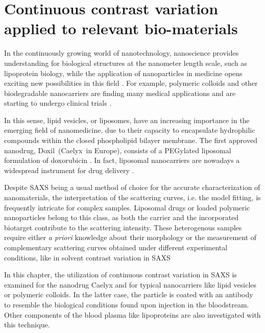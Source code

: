\chapter{Continuous contrast variation applied to relevant bio-materials}
\label{chap:bio_applications}

In the continuously growing world of nanotechnology, nanoscience provides understanding for biological structures at the nanometer length scale, such as lipoprotein biology, while the application of nanoparticles in medicine opens exciting new possibilities in this field \citep{nie_nanotechnology_2007, sahoo_nanotech_2003, wickline_nanotechnology_2003, zhou_nano-enabled_2014, rosen_rise_2005}. For example, polymeric colloids and other biodegradable nanocarriers are finding many medical applications \citep{vicent_polymer_2006} and are starting to undergo clinical trials \citep{patel_polymeric_2012,beija_colloidal_2012,cabral_progress_2014}. 

In this sense, lipid vesicles, or liposomes, have an increasing importance in the emerging field of nanomedicine, due to their capacity to encapsulate hydrophilic compounds within the closed phospholipid bilayer membrane. The first approved nanodrug, Doxil\textregistered\ (Caelyx\textregistered\ in Europe), consists of a PEGylated liposomal formulation of doxorubicin \citep{barenholz_doxil_2012}. In fact, liposomal nanocarriers are nowadays a widespread instrument for drug delivery \citep{perez-herrero_advanced_2015}.

Despite SAXS being a usual method of choice for the accurate characterization of nanomaterials, the interpretation of the scattering curves, i.e. the model fitting, is frequently intricate for complex samples. Liposomal drugs or loaded polymeric nanoparticles belong to this class, as both the carrier and the incorporated biotarget contribute to the scattering intensity. These heterogenous samples require either \emph{a priori} knowledge about their morphology or the measurement of complementary scattering curves obtained under different experimental conditions, like in solvent contrast variation in SAXS 

In this chapter, the utilization of continuous contrast variation in SAXS is examined for the nanodrug Caelyx and for typical nanocarriers like lipid vesicles or polymeric colloids. In the latter case, the particle is coated with an antibody to resemble the biological conditions found upon injection in the bloodstream. Other components of the blood plasma like lipoproteins are also investigated with this technique.


